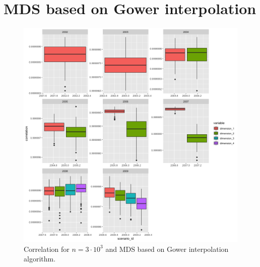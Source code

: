 \documentclass[11pt]{report}
\begin{document}
\FloatBarrier

\section{MDS based on Gower interpolation}
\label{gower_corr}

\begin{figure}[ht]
\centering
    \includegraphics[scale = 1.5]{./images/gower_correlation_3000.png}
    \caption{Correlation for $n = 3 \cdot 10^3$ and MDS based on Gower interpolation algorithm.}
    \label{gower_correlation_3000}
\end{figure}
\end{document}
